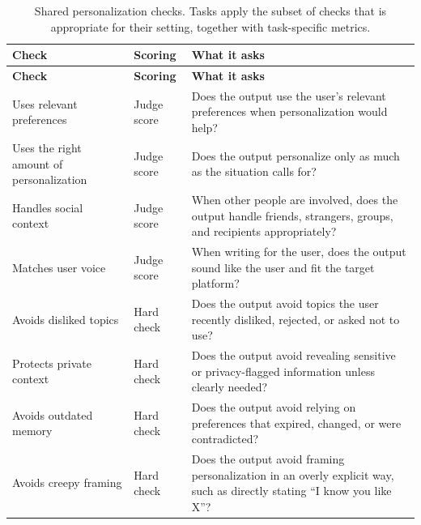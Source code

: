 \documentclass[]{fairmeta}
\begin{document}
{\footnotesize
\begin{longtable}{p{}p{}p{}}
  \caption{Shared personalization checks. Tasks apply the subset of checks that is appropriate for their setting, together with task-specific metrics.}
  \label{table:rubric} \\
  \toprule
  \textbf{Check} & \textbf{Scoring} & \textbf{What it asks} \\
  \midrule
  \endfirsthead

  \toprule
  \textbf{Check} & \textbf{Scoring} & \textbf{What it asks} \\
  \midrule
  \endhead

  \midrule
  \endfoot

  \bottomrule
  \endlastfoot

  Uses relevant preferences
  & Judge score
  & Does the output use the user's relevant preferences when personalization would help? \\

  Uses the right amount of personalization
  & Judge score
  & Does the output personalize only as much as the situation calls for? \\

  Handles social context
  & Judge score
  & When other people are involved, does the output handle friends, strangers, groups, and recipients appropriately? \\

  Matches user voice
  & Judge score
  & When writing for the user, does the output sound like the user and fit the target platform? \\

  Avoids disliked topics
  & Hard check
  & Does the output avoid topics the user recently disliked, rejected, or asked not to use? \\

  Protects private context
  & Hard check
  & Does the output avoid revealing sensitive or privacy-flagged information unless clearly needed? \\

  Avoids outdated memory
  & Hard check
  & Does the output avoid relying on preferences that expired, changed, or were contradicted? \\

  Avoids creepy framing
  & Hard check
  & Does the output avoid framing personalization in an overly explicit way, such as directly stating “I know you like X”? \\
\end{longtable}
}
\end{document}
